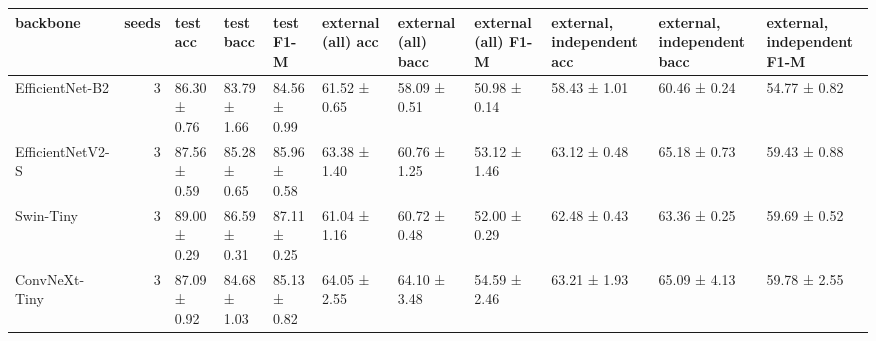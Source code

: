 \begin{tabular}{lrlllllllll}
\toprule
backbone & seeds & test acc & test bacc & test F1-M & external (all) acc & external (all) bacc & external (all) F1-M & external, independent acc & external, independent bacc & external, independent F1-M \\
\midrule
EfficientNet-B2 & 3 & 86.30 ± 0.76 & 83.79 ± 1.66 & 84.56 ± 0.99 & 61.52 ± 0.65 & 58.09 ± 0.51 & 50.98 ± 0.14 & 58.43 ± 1.01 & 60.46 ± 0.24 & 54.77 ± 0.82 \\
EfficientNetV2-S & 3 & 87.56 ± 0.59 & 85.28 ± 0.65 & 85.96 ± 0.58 & 63.38 ± 1.40 & 60.76 ± 1.25 & 53.12 ± 1.46 & 63.12 ± 0.48 & 65.18 ± 0.73 & 59.43 ± 0.88 \\
Swin-Tiny & 3 & 89.00 ± 0.29 & 86.59 ± 0.31 & 87.11 ± 0.25 & 61.04 ± 1.16 & 60.72 ± 0.48 & 52.00 ± 0.29 & 62.48 ± 0.43 & 63.36 ± 0.25 & 59.69 ± 0.52 \\
ConvNeXt-Tiny & 3 & 87.09 ± 0.92 & 84.68 ± 1.03 & 85.13 ± 0.82 & 64.05 ± 2.55 & 64.10 ± 3.48 & 54.59 ± 2.46 & 63.21 ± 1.93 & 65.09 ± 4.13 & 59.78 ± 2.55 \\
\bottomrule
\end{tabular}
